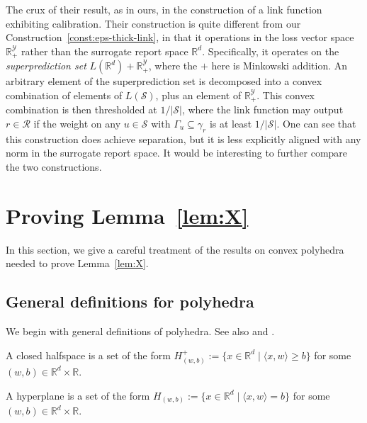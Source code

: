 \documentclass[twoside,11pt]{article}
\newcommand{\reals}{\mathbb{R}}
\newcommand{\R}{\mathcal{R}}
\newcommand{\Sc}{\mathcal{S}}
\newcommand{\Y}{\mathcal{Y}}
\newcommand{\inprod}[2]{\langle #1, #2 \rangle}%
\begin{document}
The crux of their result, as in ours, in the construction of a link function exhibiting calibration.
Their construction is quite different from our Construction~\ref{const:eps-thick-link}, in that it operations in the loss vector space $\reals^\Y_+$ rather than the surrogate report space $\reals^d$.
Specifically, it operates on the \emph{superprediction set} $L(\reals^d) + \reals^\Y_+$, where the $+$ here is Minkowski addition.
An arbitrary element of the superprediction set is decomposed into a convex combination of elements of $L(\Sc)$, plus an element of $\reals^\Y_+$.
This convex combination is then thresholded at $1/|\Sc|$, where the link function may output $r\in\R$ if the weight on any $u\in\Sc$ with $\Gamma_u \subseteq \gamma_r$ is at least $1/|\Sc|$.
One can see that this construction does achieve separation, but it is less explicitly aligned with any norm in the surrogate report space.
It would be interesting to further compare the two constructions.


\section{Proving Lemma~\ref{lem:X}}
\label{app:polyhedra}

In this section, we give a careful treatment of the results on convex polyhedra needed to prove Lemma~\ref{lem:X}.

\subsection{General definitions for polyhedra}
\label{app:polyhedra:defs}

We begin with general definitions of polyhedra.
See also \citet{ziegler1993lectures} and \citet{gallier2008notes}.


\begin{definition}
  A closed halfspace is a set of the form $H_{(w,b)}^+ := \{ x \in \reals^d \mid \inprod{x}{w} \geq b\}$ for some $(w,b) \in \reals^d \times \reals$.
\end{definition}
\begin{definition}[Hyperplane]
  A hyperplane is a set of the form $H_{(w,b)} := \{ x \in \reals^d \mid \inprod{x}{w} = b\}$ for some $(w,b)\in\reals^d \times \reals$.
\end{definition} 
\end{document}
